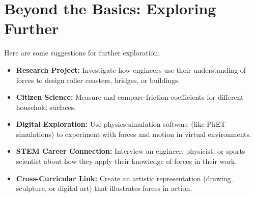 \documentclass[justified,notoc]{tufte-book}
\begin{document}
\section{Beyond the Basics: Exploring Further}

 Here are some suggestions for further exploration:

\begin{itemize}
    \item \textbf{Research Project:} Investigate how engineers use their understanding of forces to design roller coasters, bridges, or buildings.

    \item \textbf{Citizen Science:} Measure and compare friction coefficients for different household surfaces.

    \item \textbf{Digital Exploration:} Use physics simulation software (like PhET simulations) to experiment with forces and motion in virtual environments.

    \item \textbf{STEM Career Connection:} Interview an engineer, physicist, or sports scientist about how they apply their knowledge of forces in their work.

    \item \textbf{Cross-Curricular Link:} Create an artistic representation (drawing, sculpture, or digital art) that illustrates forces in action.
\end{itemize}
\end{document}
